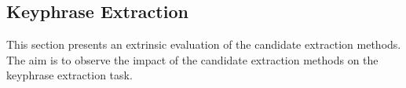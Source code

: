 

  \subsection{Keyphrase Extraction}
  \label{subsec:keyphrase_extraction}
    This section presents an extrinsic evaluation of the candidate extraction
    methods. The aim is to observe the impact of the candidate extraction
    methods on the keyphrase extraction task.

